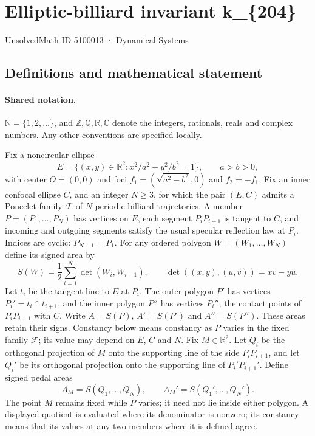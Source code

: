 \documentclass[11pt]{article}
\begin{document}
\setcounter{section}{5100012}
\section{Elliptic-billiard invariant k\_\{204\}}\label{5100013}
{\small\sffamily UnsolvedMath ID 5100013 · Dynamical Systems}
\subsection{Definitions and mathematical statement}

\paragraph{Shared notation.}$\mathbb N=\{1,2,\ldots\}$, and $\mathbb Z,\mathbb Q,\mathbb R,\mathbb C$ denote the integers, rationals, reals and complex numbers. Any other conventions are specified locally.


Fix a noncircular ellipse
\[
E=\{(x,y)\in\mathbb R^2:x^2/a^2+y^2/b^2=1\},\qquad a>b>0,
\]
with center $O=(0,0)$ and foci $f_1=(\sqrt{a^2-b^2},0)$ and $f_2=-f_1$. Fix an inner confocal ellipse $C$, and an integer $N\geq3$, for which the pair $(E,C)$ admits a Poncelet family $\mathcal F$ of $N$-periodic billiard trajectories. A member $P=(P_1,\ldots,P_N)$ has vertices on $E$, each segment $P_iP_{i+1}$ is tangent to $C$, and incoming and outgoing segments satisfy the usual specular reflection law at $P_i$. Indices are cyclic: $P_{N+1}=P_1$.
For any ordered polygon $W=(W_1,\ldots,W_N)$ define its signed area by
\[
S(W)=\frac12\sum_{i=1}^N\det(W_i,W_{i+1}),\qquad
\det((x,y),(u,v))=xv-yu.
\]
Let $t_i$ be the tangent line to $E$ at $P_i$. The outer polygon $P'$ has vertices $P_i'=t_i\cap t_{i+1}$, and the inner polygon $P''$ has vertices $P_i''$, the contact points of $P_iP_{i+1}$ with $C$. Write $A=S(P)$, $A'=S(P')$ and $A''=S(P'')$. These areas retain their signs. Constancy below means constancy as $P$ varies in the fixed family $\mathcal F$; its value may depend on $E$, $C$ and $N$.
Fix $M\in\mathbb R^2$. Let $Q_i$ be the orthogonal projection of $M$ onto the supporting line of the side $P_iP_{i+1}$, and let $Q_i'$ be its orthogonal projection onto the supporting line of $P_i'P_{i+1}'$. Define signed pedal areas
\[
A_M=S(Q_1,\ldots,Q_N),\qquad A_M'=S(Q_1',\ldots,Q_N').
\]
The point $M$ remains fixed while $P$ varies; it need not lie inside either polygon.
A displayed quotient is evaluated where its denominator is nonzero; its constancy means that its values at any two members where it is defined agree.
\end{document}
